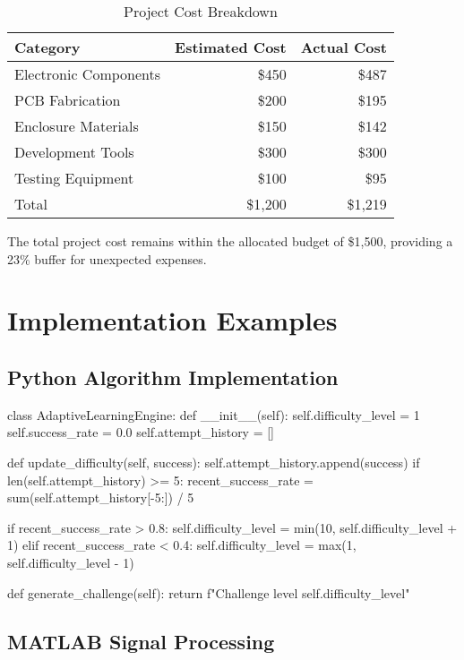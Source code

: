\documentclass[final]{designreport}
\begin{document}
\begin{table}[htbp]
\centering
\caption{Project Cost Breakdown}
\begin{tabular}{@{}lrr@{}}
\toprule
Category & Estimated Cost & Actual Cost \\
\midrule
Electronic Components & \$450 & \$487 \\
PCB Fabrication & \$200 & \$195 \\
Enclosure Materials & \$150 & \$142 \\
Development Tools & \$300 & \$300 \\
Testing Equipment & \$100 & \$95 \\
\midrule
Total & \$1,200 & \$1,219 \\
\bottomrule
\end{tabular}
\end{table}

The total project cost remains within the allocated budget of \$1,500, providing a 23\% buffer for unexpected expenses.

\section{Implementation Examples}

\subsection{Python Algorithm Implementation}

\begin{reportpython}[caption={Adaptive Learning Algorithm}]
class AdaptiveLearningEngine:
    def __init__(self):
        self.difficulty_level = 1
        self.success_rate = 0.0
        self.attempt_history = []
    
    def update_difficulty(self, success):
        self.attempt_history.append(success)
        if len(self.attempt_history) >= 5:
            recent_success_rate = sum(self.attempt_history[-5:]) / 5
            
            if recent_success_rate > 0.8:
                self.difficulty_level = min(10, self.difficulty_level + 1)
            elif recent_success_rate < 0.4:
                self.difficulty_level = max(1, self.difficulty_level - 1)
    
    def generate_challenge(self):
        return f"Challenge level {self.difficulty_level}"
\end{reportpython}

\subsection{MATLAB Signal Processing}
\end{document}
